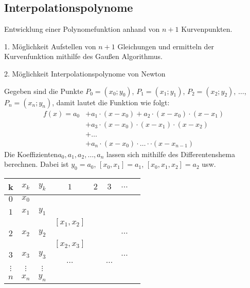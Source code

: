 \subsection{Interpolationspolynome}
Entwicklung einer Polynomefunktion anhand von $n+1$ Kurvenpunkten.
\begin{description*}
 \item[1. Möglichkeit] Aufstellen von $n+1$ Gleichungen und ermitteln der Kurvenfunktion mithilfe des Gaußen Algorithmus.
 \item[2. Möglichkeit] Interpolationspolynome von Newton
\end{description*}


\begin{merkbox}Gegeben sind die Punkte $P_0=(x_0;y_0)$, $P_1=(x_1;y_1)$, $P_2=(x_2;y_2)$, $\ldots$, $P_n=(x_n;y_n)$, damit lautet die Funktion wie folgt:
\begin{align}
 f(x)=a_0&+a_1\cdot (x-x_0)+ a_2\cdot (x-x_0)\cdot(x-x_1)\\
	 &+a_3\cdot(x-x_0)\cdot(x-x_1)\cdot(x-x_2)\\
	 &+\ldots\\
	 &+a_n\cdot(x-x_0)\cdot\ldots\cdot\cdot(x-x_{n-1})
\end{align}
Die Koeffizienten$a_0, a_1, a_2,\ldots, a_n$ lassen sich mithilfe des Differentenshema berechnen. Dabei ist $y_0=a_0$, $[x_0,x_1]=a_1$, $[x_0,x_1,x_2]=a_2$
 usw. 
\end{merkbox}


\noindent\begin{tabularx}{\linewidth}{cccccccX}
\toprule
 k	&$x_k$	&$y_k$		&$1$		&$2$		&$3$			&$\ldots$	\\ \midrule
 $0$	&$x_0$	&\hebox{$y_0$}	&		&		&			&		\\
	&	&		&\hebox{$[x_0,x_1]$}	&		&			&		\\
 $1$	&$x_1$	&$y_1$		&		&\hebox{$[x_0,x_1,x_2]$}&			&		\\
 	&	&		&$[x_1,x_2]$	&		&\hebox{$[x_0,x_1,x_2,x_3]$}	&		\\
 $2$	&$x_2$	&$y_2$		&		&\heboxc{$[x_1,x_2,x_3]$}&			&$\ldots$	\\
 	&	&		&$[x_2,x_3]$	&		&\heboxc{$[x_1,x_2,x_3,x_4]$}	&		\\
 $3$	&$x_3$	&$y_3$		&		&\heboxc{$[x_2,x_3,x_4]$}&			&$\ldots$	\\
 	&	&		&$\ldots$	&		&$\ldots$		&		\\
 $\vdots$&$\vdots$&$\vdots$	&		&		&			&		\\
 $n$	&$x_n$	&$y_n$		&		&		&			&		\\ \bottomrule
\end{tabularx}

